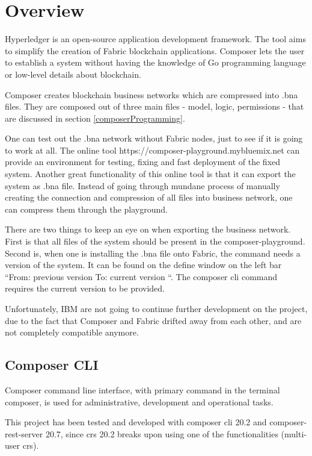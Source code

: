 \documentclass[a4paper,11pt]{report}
\begin{document}
\section{Overview}
\label{composerOverview}
Hyperledger is an open-source application development framework. The tool aims to simplify the creation of Fabric blockchain applications. Composer lets the user to establish a system without having the knowledge of Go programming language or low-level details about blockchain. 

	Composer creates blockchain business networks which are compressed into .bna files. They are composed out of three main files - model, logic, permissions - that are discussed in section \ref{composerProgramming}.
	
One can test out the .bna network without Fabric nodes, just to see if it is going to work at all. The online tool https://composer-playground.mybluemix.net can provide an environment for testing, fixing and fast deployment of the fixed system. Another great functionality of this online tool is that it can export the system as .bna file. Instead of going through mundane process of manually creating the connection and compression of all files into business network, one can compress them through the playground. 

There are two things to keep an eye on when exporting the business network. First is that all files of the system should be present in the composer-playground. Second is, when one is installing the .bna file onto Fabric, the command needs a version of the system. It can be found on the define window on the left bar “From: previous version   To: current version “. The composer cli command requires the current version to be provided. 

	Unfortunately, IBM are not going to continue further development on the project, due to the fact that Composer and Fabric drifted away from each other, and are not completely compatible anymore. \cite{letter}

\subsection{Composer CLI}

Composer command line interface, with primary command in the terminal composer, is used for administrative, development and operational tasks. 

	This project has been tested and developed with composer cli 20.2 and composer-rest-server 20.7, since crs 20.2 breaks upon using one of the functionalities (multi-user crs). 
\end{document}
